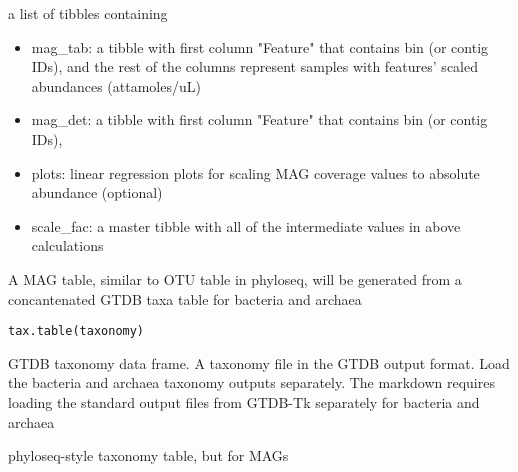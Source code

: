 \documentclass[a4paper]{book}
\begin{document}
%
\begin{Value}
a list of tibbles containing
\begin{itemize}

\item{} mag\_tab: a tibble with first column "Feature" that contains bin (or contig IDs), and the rest of the columns represent samples with features' scaled abundances (attamoles/uL)
\item{} mag\_det: a tibble with first column "Feature" that contains bin (or contig IDs),
\item{} plots: linear regression plots for scaling MAG coverage values to absolute abundance (optional)
\item{} scale\_fac: a master tibble with all of the intermediate values in above calculations

\end{itemize}

\end{Value}
%
\begin{Description}\relax
A MAG table, similar to OTU table in phyloseq, will be generated from a
concantenated GTDB taxa table for bacteria and archaea
\end{Description}
%
\begin{Usage}
\begin{verbatim}
tax.table(taxonomy)
\end{verbatim}
\end{Usage}
%
\begin{Arguments}
\begin{ldescription}
\item[\code{taxonomy}] GTDB taxonomy data frame.  A taxonomy file in the GTDB output format. Load the bacteria and archaea taxonomy outputs separately.
The markdown requires loading the standard output files from GTDB-Tk separately for bacteria and archaea
\end{ldescription}
\end{Arguments}
%
\begin{Value}
phyloseq-style taxonomy table, but for MAGs
\end{Value}
\printindex{}
\end{document}
